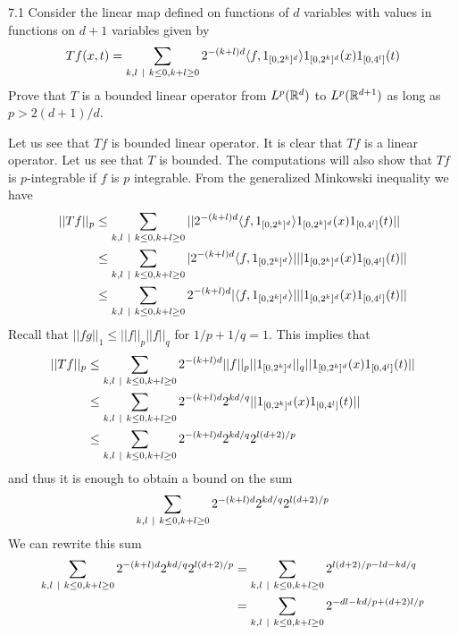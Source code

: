 \documentclass{scrartcl}
\begin{document}
\newpage

\begin{problem}{7.1}
Consider the linear map defined on functions of $d$ variables with values in functions on $d+1$ variables
given by \begin{align*}
    Tf(x,t) = \sum_{k,l\ \vert \  k\leq 0, k+l\geq 0}2^{-(k+l)d}\langle f, 1_{[0,2^k]^d}\rangle 1_{[0,2^k]^d}(x)1_{[0,4^l]}(t)
\end{align*}
Prove that $T$ is a bounded linear operator from $L^p(\mathbb{R}^d)$ to $L^{p}(\mathbb{R}^{d+1})$ as long
as $p > 2(d+1)/d$.
\end{problem}
\begin{solution}
Let us see that $Tf$ is bounded linear operator. It is clear that $Tf$ is a linear operator. Let us see that $T$ is bounded.
The computations will also show that $Tf$ is $p$-integrable if $f$ is $p$ integrable. From the generalized Minkowski inequality we have \begin{align*}
    ||Tf||_p &\leq \sum_{k,l\ \vert \  k\leq 0, k+l\geq 0}||2^{-(k+l)d}\langle f,1_{[0,2^k]^d}\rangle1_{[0,2^k]^d}(x)1_{[0,4^l]}(t)||\\
    &\leq \sum_{k,l\ \vert \  k\leq 0, k+l\geq 0}|2^{-(k+l)d}\langle f,1_{[0,2^k]^d}\rangle|||1_{[0,2^k]^d}(x)1_{[0,4^l]}(t)|| \\
    &\leq\sum_{k,l\ \vert \  k\leq 0, k+l\geq 0}2^{-(k+l)d}|\langle f,1_{[0,2^k]^d}\rangle|||1_{[0,2^k]^d}(x)1_{[0,4^l]}(t)|| 
\end{align*} Recall that $||fg||_1 \leq ||f||_p||f||_q$ for $1/p + 1/q = 1$. This implies that 
\begin{align*}
    ||Tf||_p &\leq \sum_{k,l\ \vert \  k\leq 0, k+l\geq 0}2^{-(k+l)d}||f||_p||1_{[0,2^k]^d}||_q||1_{[0,2^k]^d}(x)1_{[0,4^l]}(t)|| \\
    &\leq\sum_{k,l\ \vert \  k\leq 0, k+l\geq 0} 2^{-(k+l)d} 2^{kd/q}||1_{[0,2^k]^d}(x)1_{[0,4^l]}(t)||  \\
    &\leq\sum_{k,l\ \vert \  k\leq 0, k+l\geq 0}2^{-(k+l)d} 2^{kd/q} 2^{l(d+2)/p}
\end{align*} and thus it is enough to obtain a bound on the sum \begin{align*}
    \sum_{k,l\ \vert \  k\leq 0, k+l\geq 0}2^{-(k+l)d} 2^{kd/q} 2^{l(d+2)/p}
\end{align*} We can rewrite this sum \begin{align*}
    \sum_{k,l\st k\leq 0, k+l\geq 0}2^{-(k+l)d} 2^{kd/q} 2^{l(d+2)/p} &= \sum_{k,l\st k\leq 0, k+l\geq 0}2^{l(d+2)/p - ld - kd/q} \\
    &= \sum_{k,l\st k\leq 0, k+l\geq 0}2^{-dl - kd/p + (d+2)l/p}\\

\end{align*}
\end{solution}
\end{document}
